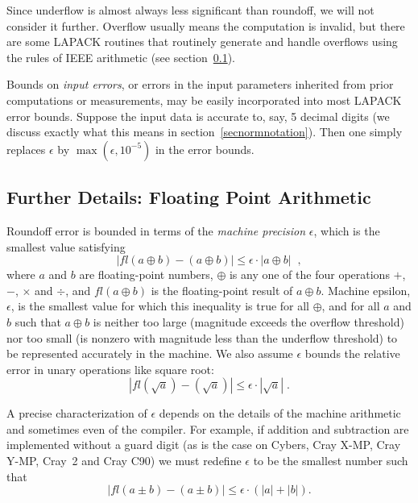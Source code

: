 Since underflow is almost always less significant than roundoff,
we will not consider it further.
Overflow usually means the computation is invalid, but there
are some LAPACK routines that routinely generate and handle overflows
using the rules of IEEE arithmetic
(see section~\ref{secbackgroundfloatingpoint}).

Bounds on {\em input errors}, or errors in the input parameters inherited
from prior computations or measurements, may be easily incorporated
into most LAPACK error bounds.
Suppose the input data is accurate to, say, 5 decimal digits
(we discuss exactly what
this means in section~\ref{secnormnotation}). Then one simply replaces
$\epsilon$ by $\max(\epsilon, 10^{-5})$ in the error bounds.

\subsection{Further Details:  Floating Point Arithmetic}\label{secbackgroundfloatingpoint}

Roundoff error is bounded in terms of the {\em machine precision}
$\epsilon$,
which is the smallest value satisfying
\[
| fl(a \oplus b ) - (a \oplus b ) | \leq \epsilon \cdot | a \oplus b | \; \; ,
\]
where $a$ and $b$ are floating-point numbers,
$\oplus$ is any one of the four operations $+$, $-$, $\times$ and $\div$,
and $fl(a \oplus b)$ is the floating-point result of $a \oplus b$.
Machine epsilon, $\epsilon$, is the smallest value for which this inequality
is true for all $\oplus$, and for all $a$ and $b$ such that
$a \oplus b$ is neither too large (magnitude exceeds the overflow
threshold)
nor too small
(is nonzero with magnitude less than the underflow threshold)
to be represented accurately in the machine.
We also assume $\epsilon$ bounds the relative error in unary
operations like square root:
\[
| fl( \sqrt{a} ) - (\sqrt{a} ) | \leq \epsilon \cdot | \sqrt{a} | \; .
\]

A precise characterization of $\epsilon$ depends on the details of the
machine arithmetic and sometimes even of the compiler.
For example, if addition and
subtraction are implemented without a guard digit (as is the
case on Cybers, Cray X-MP, Cray Y-MP, Cray~2 and Cray C90)
we must redefine $\epsilon$ to be the smallest number
such that
\[
| fl(a \pm b ) - (a \pm b ) | \leq \epsilon \cdot ( |a| + |b| ).
\]

